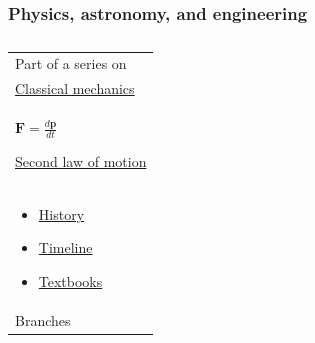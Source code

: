 \subsubsection[Physics, astronomy, and engineering]{\texorpdfstring{\protect\hypertarget{Physics.2C_astronomy.2C_and_engineering}{}{}Physics, astronomy, and engineering}{Physics, astronomy, and engineering}}\label{Physicsux2c_astronomyux2c_and_engineering}

\begin{longtable}[]{@{}
  >{\raggedright\arraybackslash}p{}@{}}
\caption{}\label{mwA7E}\tabularnewline
\toprule\noalign{}
\endfirsthead
\endhead
\bottomrule\noalign{}
\endlastfoot
Part of a series on \\
\href{https://en.wikipedia.org/wiki/Classical_mechanics}{Classical mechanics} \\
\begin{minipage}[t]{\linewidth}\raggedright
{{\(\textbf{F} = \frac{d\mathbf{p}}{dt}\)}{}}

\href{https://en.wikipedia.org/wiki/Second_law_of_motion}{Second law of motion}
\end{minipage} \\
\begin{minipage}[t]{\linewidth}\raggedright
\begin{itemize}
\tightlist
\item
  \href{https://en.wikipedia.org/wiki/History_of_classical_mechanics}{History}
\item
  \href{https://en.wikipedia.org/wiki/Timeline_of_classical_mechanics}{Timeline}
\item
  \href{https://en.wikipedia.org/wiki/List_of_textbooks_on_classical_mechanics_and_quantum_mechanics}{Textbooks}
\end{itemize}
\end{minipage} \\
\begin{minipage}[t]{\linewidth}\raggedright
Branches


\end{minipage}
\end{longtable}
